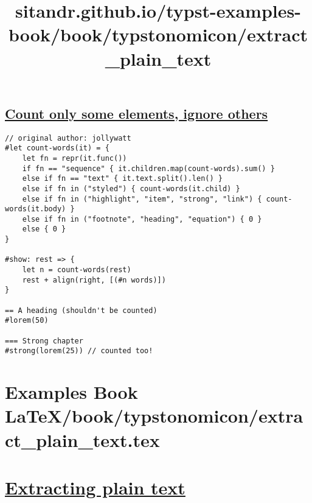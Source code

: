 \subsection{\texorpdfstring{\hyperref[count-only-some-elements-ignore-others]{Count
only some elements, ignore
others}}{Count only some elements, ignore others}}\label{count-only-some-elements-ignore-others}

\begin{verbatim}
// original author: jollywatt
#let count-words(it) = {
    let fn = repr(it.func())
    if fn == "sequence" { it.children.map(count-words).sum() }
    else if fn == "text" { it.text.split().len() }
    else if fn in ("styled") { count-words(it.child) }
    else if fn in ("highlight", "item", "strong", "link") { count-words(it.body) }
    else if fn in ("footnote", "heading", "equation") { 0 }
    else { 0 }
}

#show: rest => {
    let n = count-words(rest)
    rest + align(right, [(#n words)])
}

== A heading (shouldn't be counted)
#lorem(50)

=== Strong chapter
#strong(lorem(25)) // counted too!
\end{verbatim}

\pandocbounded{}


\section{Examples Book LaTeX/book/typstonomicon/extract_plain_text.tex}
\title{sitandr.github.io/typst-examples-book/book/typstonomicon/extract_plain_text}

\section{\texorpdfstring{\hyperref[extracting-plain-text]{Extracting
plain text}}{Extracting plain text}}\label{extracting-plain-text}

